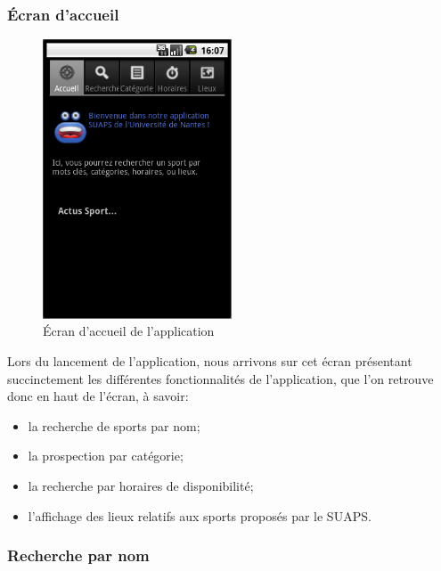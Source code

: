 \documentclass[french, titlepage, 11pt, a4paper]{article}
\begin{document}
		\subsubsection{Écran d'accueil}

		\begin{figure}[ht]
			\centering
			\includegraphics[width=0.5\textwidth]{accueil.png}
			\caption{Écran d'accueil de l'application}
			\label{fig:accueil}
		\end{figure}

		Lors du lancement de l'application, nous arrivons sur cet écran présentant
		succinctement les différentes fonctionnalités de l'application, que l'on
		retrouve donc en haut de l'écran, à savoir:

		\begin{itemize}
			\item la recherche de sports par nom;
			\item la prospection par catégorie;
			\item la recherche par horaires de disponibilité;
			\item l'affichage des lieux relatifs aux sports proposés par le SUAPS.
		\end{itemize}

		\subsubsection{Recherche par nom}
\end{document}
